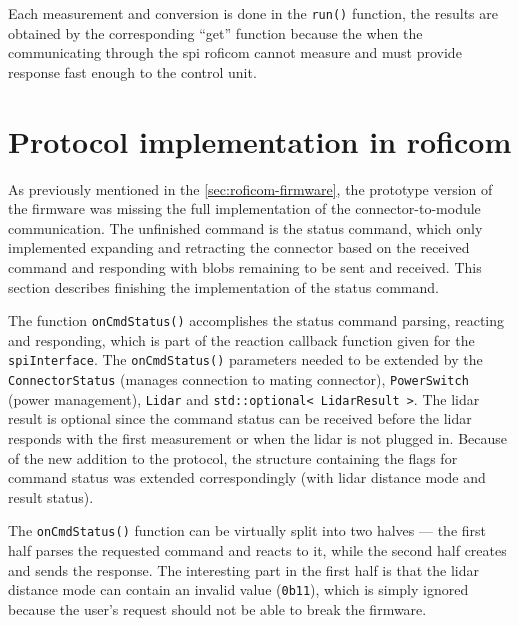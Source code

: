 \documentclass[
  digital,     %
  oneside,     %
  nosansbold,  %
  nocolorbold, %
  nolof,         %
  nolot,         %
]{fithesis4}
\newcommand{\TODO}[1]{\textcolor{red}{\textit{#1}}}
\newcommand{\TODOLIST}[1]{}
\begin{document}
{{{Each measurement and conversion is done in the \lstinline|run()| function, the results are obtained by the corresponding ``get'' function because the when the communicating through the \acrshort{spi} \acrshort{roficom} cannot measure and must provide response fast enough to the control unit.

\section[ Protocol Implementation in RoFICoM ]{ Protocol implementation in \acrshort{roficom} }
\TODOLIST{
\begin{itemize}
    \item Added power information - connection of INT and EXT, current and voltage of INT and EXT.
    \item Connection to mating side.
    \item Lidar status and distance and setting \TODO{ distance mode ?? }.
\end{itemize}
}

As previously mentioned in the \autoref{sec:roficom-firmware}, the prototype version of the firmware was missing the full implementation of the connector-to-module communication. The unfinished command is the status command, which only implemented expanding and retracting the connector based on the received command and responding with blobs remaining to be sent and received. This section describes finishing the implementation of the status command.

The function \lstinline|onCmdStatus()| accomplishes the status command parsing, reacting and responding, which is part of the reaction callback function given for the \lstinline|spiInterface|. The \lstinline|onCmdStatus()| parameters needed to be extended by the \lstinline|ConnectorStatus| (manages connection to mating connector), \lstinline|PowerSwitch| (power management), \lstinline|Lidar| and \lstinline|std::optional< LidarResult >|. The \acrshort{lidar} result is optional since the command status can be received before the \acrshort{lidar} responds with the first measurement or when the \acrshort{lidar} is not plugged in. Because of the new addition to the protocol, the structure containing the flags for command status was extended correspondingly (with \acrshort{lidar} distance mode and result status).

The \lstinline|onCmdStatus()| function can be virtually split into two halves --- the first half parses the requested command and reacts to it, while the second half creates and sends the response. The interesting part in the first half is that the \acrshort{lidar} distance mode can contain an invalid value (\lstinline|0b11|), which is simply ignored because the user's request should not be able to break the firmware.

}}}
\end{document}

